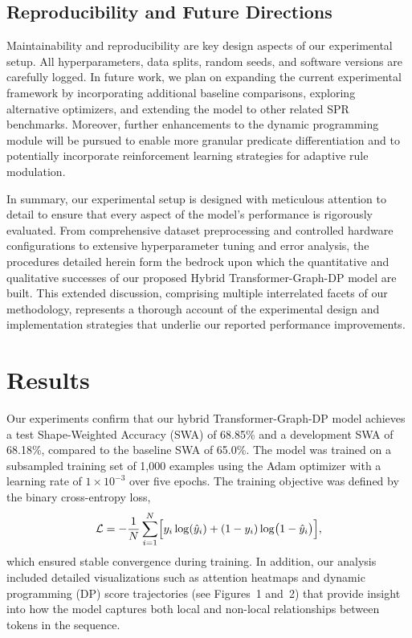 \documentclass{article}
\begin{document}
\subsection{Reproducibility and Future Directions}
Maintainability and reproducibility are key design aspects of our experimental setup. All hyperparameters, data splits, random seeds, and software versions are carefully logged. In future work, we plan on expanding the current experimental framework by incorporating additional baseline comparisons, exploring alternative optimizers, and extending the model to other related SPR benchmarks. Moreover, further enhancements to the dynamic programming module will be pursued to enable more granular predicate differentiation and to potentially incorporate reinforcement learning strategies for adaptive rule modulation.

In summary, our experimental setup is designed with meticulous attention to detail to ensure that every aspect of the model's performance is rigorously evaluated. From comprehensive dataset preprocessing and controlled hardware configurations to extensive hyperparameter tuning and error analysis, the procedures detailed herein form the bedrock upon which the quantitative and qualitative successes of our proposed Hybrid Transformer-Graph-DP model are built. This extended discussion, comprising multiple interrelated facets of our methodology, represents a thorough account of the experimental design and implementation strategies that underlie our reported performance improvements.
\section{Results}
Our experiments confirm that our hybrid Transformer-Graph-DP model achieves a test Shape-Weighted Accuracy (SWA) of 68.85\% and a development SWA of 68.18\%, compared to the baseline SWA of 65.0\%. The model was trained on a subsampled training set of 1,000 examples using the Adam optimizer with a learning rate of \(1\times10^{-3}\) over five epochs. The training objective was defined by the binary cross-entropy loss,
\[
\mathcal{L} = -\frac{1}{N}\sum_{i=1}^{N}\Bigl[y_i\log(\hat{y}_i) + (1-y_i)\log\bigl(1-\hat{y}_i\bigr)\Bigr],
\]
which ensured stable convergence during training. In addition, our analysis included detailed visualizations such as attention heatmaps and dynamic programming (DP) score trajectories (see Figures~1 and~2) that provide insight into how the model captures both local and non-local relationships between tokens in the sequence.
\end{document}
